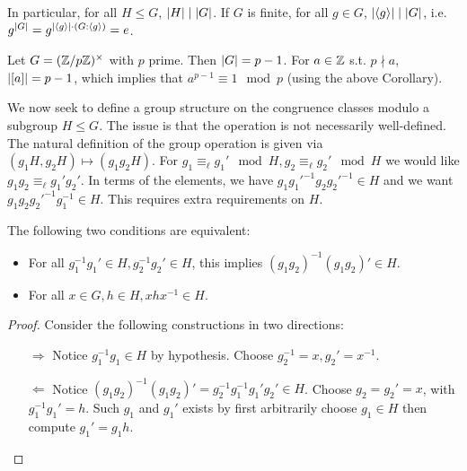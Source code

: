 \begin{corollary}
    In particular, for all $H \leq G$, $\left|H\right| \mid \left|G\right|$. If $G$ is finite, for all $g \in G$, $\left|\left\langle g \right\rangle\right| \mid \left|G\right|$, i.e. $g^{\left|G\right|} = g^{\left|\left\langle g \right\rangle\right| \cdot (G : \left\langle g \right\rangle)} = e$.
\end{corollary}

\begin{example}
    Let $G = (\mathbb{Z}/p\mathbb{Z})^{\times}$ with $p$ prime. Then $\left|G\right| = p - 1$. For $a \in \mathbb{Z}$ s.t. $p \nmid a$, $\left|[a]\right| = p-1$, which implies that $a^{p-1} \equiv 1 \mod p$ (using the above Corollary). 
\end{example}

\textstart
We now seek to define a group structure on the congruence classes modulo a subgroup $H \leq G$. The issue is that the operation is not necessarily well-defined. The natural definition of the group operation is given via $(g_1 H, g_2 H) \mapsto (g_1 g_2 H)$. For $g_1 \equiv_{\ell} g_1' \mod H, g_2 \equiv_{\ell} g_2' \mod H$ we would like $g_1 g_2 \equiv_{\ell} g_1' g_2'$. In terms of the elements, we have $g_1 g_1'^{-1} g_2 g_2'^{-1} \in H$ and we want $g_1 g_2 g_2'^{-1} g_1^{-1} \in H$. This requires extra requirements on $H$.

\begin{claim}\label{clm: constraint on group to have operations on cong classes}
    The following two conditions are equivalent:
    \begin{itemize}
        \item For all $g_1^{-1}g_1' \in H, g_2^{-1}g_2' \in H$, this implies $(g_1 g_2)^{-1}(g_1 g_2)' \in H$.
        \item For all $x \in G, h \in H, xhx^{-1} \in H$.
    \end{itemize}
\end{claim}

\begin{proof}
    Consider the following constructions in two directions:
    \begin{itemize}
        \item[$\Rightarrow$] Notice $g_1^{-1} g_1 \in H$ by hypothesis. Choose $g_2^{-1} = x, g_2' = x^{-1}$.
        \item[$\Leftarrow$] Notice $(g_1 g_2)^{-1}(g_1 g_2)' = g_2^{-1} g_1^{-1} g_1' g_2' \in H$. Choose $g_2 = g_2' = x$, with $g_1^{-1} g_1' = h$. Such $g_1$ and $g_1'$ exists by first arbitrarily choose $g_1 \in H$ then compute $g_1' = g_1 h$.
    \end{itemize}
\end{proof}

